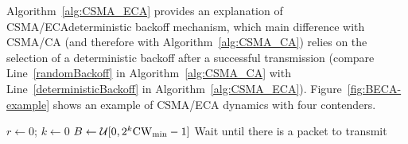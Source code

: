 \documentclass[a4paper,journal]{IEEEtran}
\providecommand{\DIFaddtex}[1]{{\protect\color{blue}\uwave{#1}}} %
\providecommand{\DIFaddbegin}{} %
\providecommand{\DIFaddend}{} %
\providecommand{\DIFdelbegin}{} %
\providecommand{\DIFdelend}{} %
\providecommand{\DIFadd}[1]{\texorpdfstring{\DIFaddtex{#1}}{#1}} %
\begin{document}
Algorithm~\ref{alg:CSMA_ECA} provides an explanation of CSMA/ECA\DIFaddbegin \DIFadd{'s }\DIFaddend deterministic backoff mechanism, which main difference with CSMA/CA (and therefore with Algorithm~\ref{alg:CSMA_CA}) relies on the selection of a deterministic backoff after a successful transmission (compare Line~\ref{randomBackoff} in Algorithm~\ref{alg:CSMA_CA} with Line~\ref{deterministicBackoff} in Algorithm~\ref{alg:CSMA_ECA}). Figure~\ref{fig:BECA-example} shows an example of CSMA/ECA dynamics with four contenders.

\begin{algorithm}[ht!!!]
{
  $r \leftarrow 0$; $k \leftarrow 0$\;
  $B \leftarrow \mathcal{U}[0,2^k{\rm{CW}_{min}}-1]$\;
  Wait until there is a packet to transmit\;
}
\caption{\DIFdelbegin %
\DIFdelend \DIFaddbegin \small{CSMA/CA. $r$ indicates the number of retransmission attempts, while $R$ is the maximum retransmission attempts limit. When $R$ retransmissions are reached, the packet waiting for transmission is dropped.}\DIFaddend }
\label{alg:CSMA_CA}
\end{algorithm}
\end{document}
